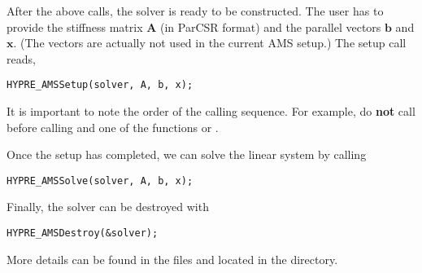 After the above calls, the solver is ready to be constructed.
The user has to provide the stiffness matrix ${\mathbf A}$ (in ParCSR format) and
the \hypre{} parallel vectors ${\mathbf b}$ and ${\mathbf x}$. (The vectors
are actually not used in the current AMS setup.) The setup call reads,
\begin{display}\begin{verbatim}
HYPRE_AMSSetup(solver, A, b, x);
\end{verbatim}\end{display}
It is important to note the order of the calling sequence. For example, do {\bf not}
call  before calling
and one of the functions
 or .

\noindent
Once the setup has completed, we can solve the linear system by calling
\begin{display}\begin{verbatim}
HYPRE_AMSSolve(solver, A, b, x);
\end{verbatim}\end{display}

\noindent
Finally, the solver can be destroyed with
\begin{display}\begin{verbatim}
HYPRE_AMSDestroy(&solver);
\end{verbatim}\end{display}

\noindent
More details can be found in the files  and 
located in the  directory.

